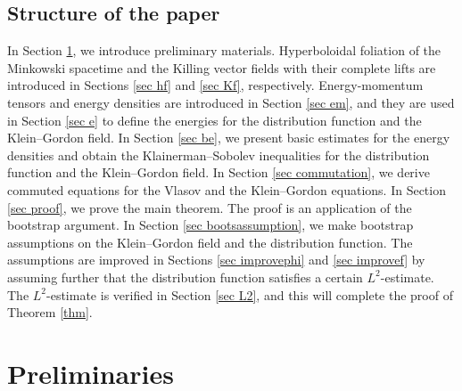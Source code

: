 \documentclass{article}
\begin{document}
%
\subsection{Structure of the paper}
In Section \ref{sec prelim}, we introduce preliminary materials. Hyperboloidal foliation of the Minkowski spacetime and the Killing vector fields with their complete lifts are introduced in Sections \ref{sec hf} and \ref{sec Kf}, respectively. Energy-momentum tensors and energy densities are introduced in Section \ref{sec em}, and they are used in Section \ref{sec e} to define the energies for the distribution function and the Klein--Gordon field. In Section \ref{sec be}, we present basic estimates for the energy densities and obtain the Klainerman--Sobolev inequalities for the distribution function and the Klein--Gordon field. In Section \ref{sec commutation}, we derive commuted equations for the Vlasov and the Klein--Gordon equations. In Section \ref{sec proof}, we prove the main theorem. The proof is an application of the bootstrap argument. In Section \ref{sec bootsassumption}, we make bootstrap assumptions on the Klein--Gordon field and the distribution function. The assumptions are improved in Sections \ref{sec improvephi} and \ref{sec improvef} by assuming further that the distribution function satisfies a certain $ L^2 $-estimate. The $ L^2 $-estimate is verified in Section \ref{sec L2}, and this will complete the proof of Theorem \ref{thm}.



%
\section{Preliminaries} \label{sec prelim}

%
\end{document}
